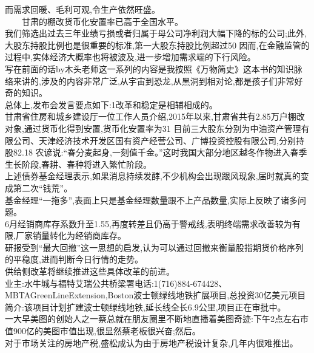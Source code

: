 \documentclass[runningheads,a4paper]{llncs}
\begin{document}
\begin{CJK*}{UTF8}{gbsn}
而需求回暖、毛利可观,令生产依然旺盛。\\
　　甘肃的棚改货币化安置率已高于全国水平。\\
我们筛选出过去三年业绩亏损或者归属于母公司净利润大幅下降的标的公司;此外,大股东持股比例也是很重要的标准,第一大股东持股比例超过50%
因而,在金融监管的过程中,实体经济大概率也将被波及,进一步增加需求端的下行风险。\\
写在前面的话by木头老师这一系列的内容是我按照《万物简史》这本书的知识脉络来讲的,涉及的内容非常广泛,从宇宙到恐龙,从黑洞到相对论,都是孩子们非常好奇的知识。\\
总体上,发布会发言要点如下:1改革和稳定是相辅相成的。\\
甘肃省住房和城乡建设厅一位工作人员介绍,2015年以来,甘肃省共有2.85万户棚改对象,通过货币化得到安置,货币化安置率为31%
目前三大股东分别为中油资产管理有限公司、天津经济技术开发区国有资产经营公司、广博投资控股有限公司,分别持股82.18%
农谚说:“春分麦起身,一刻值千金。”这时我国大部分地区越冬作物进入春季生长阶段,春耕、春种将进入繁忙阶段。\\
上述债券基金经理表示,如果消息持续发酵,不少机构会出现跟风现象,届时就真的变成第二次“钱荒”。\\
基金经理“一拖多”,表面上只是基金经理数量跟不上产品数量,实际上反映了诸多问题。\\
6月经销商库存系数升至1.55,再度转差且仍高于警戒线,表明终端需求改善较为有限,厂家销量转化为经销商库存。\\
研报受到“最大回撤”这一思想的启发,认为可以通过回撤来衡量股指期货价格序列的平稳度,进而判断今日行情的走势。\\
供给侧改革将继续推进这些具体改革的前进。\\
业主:水牛城与福特艾瑞公共桥梁署电话:1(716)884-674428、MBTAGreenLineExtension,Boston波士顿绿线地铁扩展项目,总投资30亿美元项目简介:该项目计划扩建波士顿绿线地铁,延长线全长6.9公里,项目正在审批中。\\
一大早\colorbox{red!30}{美图}的\colorbox{red!30}{创始人之一蔡总}就在\colorbox{red!30}{朋友圈}里不断地直播着\colorbox{red!30}{美图奇迹}:下午2点左右\colorbox{red!30}{市值}900亿的\colorbox{red!30}{美图市值}出现,很显然\colorbox{red!30}{蔡老板}很兴奋;然后。\\
对于\colorbox{red!30}{市场}关注的\colorbox{green!30}{房地产税},\colorbox{green!30}{盛松成}认为由于\colorbox{green!30}{房地产税}设计复杂,几年内很难推出。\\

\end{CJK*}
\end{document}

